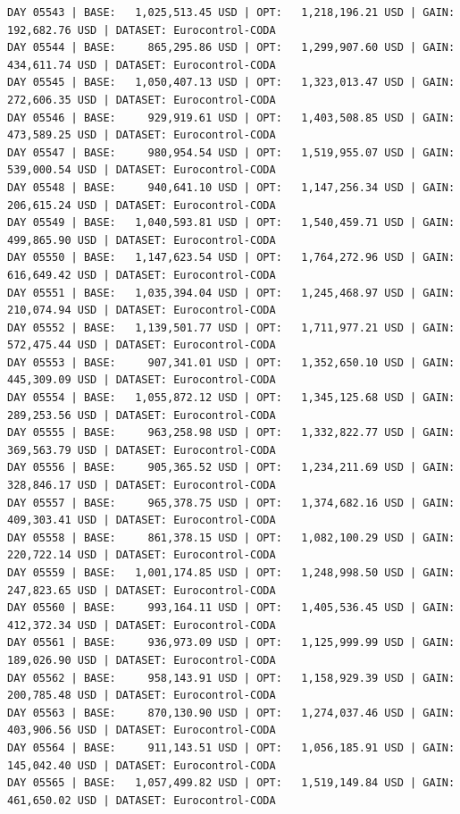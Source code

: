 \documentclass[11pt,a4paper]{article}
\begin{document}
\begin{verbatim}
DAY 05543 | BASE:   1,025,513.45 USD | OPT:   1,218,196.21 USD | GAIN: 192,682.76 USD | DATASET: Eurocontrol-CODA
DAY 05544 | BASE:     865,295.86 USD | OPT:   1,299,907.60 USD | GAIN: 434,611.74 USD | DATASET: Eurocontrol-CODA
DAY 05545 | BASE:   1,050,407.13 USD | OPT:   1,323,013.47 USD | GAIN: 272,606.35 USD | DATASET: Eurocontrol-CODA
DAY 05546 | BASE:     929,919.61 USD | OPT:   1,403,508.85 USD | GAIN: 473,589.25 USD | DATASET: Eurocontrol-CODA
DAY 05547 | BASE:     980,954.54 USD | OPT:   1,519,955.07 USD | GAIN: 539,000.54 USD | DATASET: Eurocontrol-CODA
DAY 05548 | BASE:     940,641.10 USD | OPT:   1,147,256.34 USD | GAIN: 206,615.24 USD | DATASET: Eurocontrol-CODA
DAY 05549 | BASE:   1,040,593.81 USD | OPT:   1,540,459.71 USD | GAIN: 499,865.90 USD | DATASET: Eurocontrol-CODA
DAY 05550 | BASE:   1,147,623.54 USD | OPT:   1,764,272.96 USD | GAIN: 616,649.42 USD | DATASET: Eurocontrol-CODA
DAY 05551 | BASE:   1,035,394.04 USD | OPT:   1,245,468.97 USD | GAIN: 210,074.94 USD | DATASET: Eurocontrol-CODA
DAY 05552 | BASE:   1,139,501.77 USD | OPT:   1,711,977.21 USD | GAIN: 572,475.44 USD | DATASET: Eurocontrol-CODA
DAY 05553 | BASE:     907,341.01 USD | OPT:   1,352,650.10 USD | GAIN: 445,309.09 USD | DATASET: Eurocontrol-CODA
DAY 05554 | BASE:   1,055,872.12 USD | OPT:   1,345,125.68 USD | GAIN: 289,253.56 USD | DATASET: Eurocontrol-CODA
DAY 05555 | BASE:     963,258.98 USD | OPT:   1,332,822.77 USD | GAIN: 369,563.79 USD | DATASET: Eurocontrol-CODA
DAY 05556 | BASE:     905,365.52 USD | OPT:   1,234,211.69 USD | GAIN: 328,846.17 USD | DATASET: Eurocontrol-CODA
DAY 05557 | BASE:     965,378.75 USD | OPT:   1,374,682.16 USD | GAIN: 409,303.41 USD | DATASET: Eurocontrol-CODA
DAY 05558 | BASE:     861,378.15 USD | OPT:   1,082,100.29 USD | GAIN: 220,722.14 USD | DATASET: Eurocontrol-CODA
DAY 05559 | BASE:   1,001,174.85 USD | OPT:   1,248,998.50 USD | GAIN: 247,823.65 USD | DATASET: Eurocontrol-CODA
DAY 05560 | BASE:     993,164.11 USD | OPT:   1,405,536.45 USD | GAIN: 412,372.34 USD | DATASET: Eurocontrol-CODA
DAY 05561 | BASE:     936,973.09 USD | OPT:   1,125,999.99 USD | GAIN: 189,026.90 USD | DATASET: Eurocontrol-CODA
DAY 05562 | BASE:     958,143.91 USD | OPT:   1,158,929.39 USD | GAIN: 200,785.48 USD | DATASET: Eurocontrol-CODA
DAY 05563 | BASE:     870,130.90 USD | OPT:   1,274,037.46 USD | GAIN: 403,906.56 USD | DATASET: Eurocontrol-CODA
DAY 05564 | BASE:     911,143.51 USD | OPT:   1,056,185.91 USD | GAIN: 145,042.40 USD | DATASET: Eurocontrol-CODA
DAY 05565 | BASE:   1,057,499.82 USD | OPT:   1,519,149.84 USD | GAIN: 461,650.02 USD | DATASET: Eurocontrol-CODA

\end{verbatim}
\end{document}
